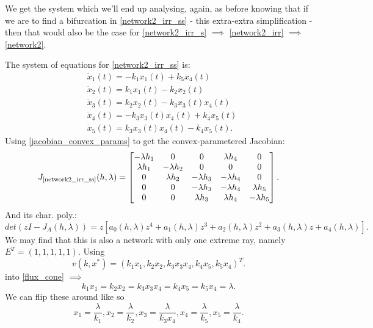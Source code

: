 We get the system which we'll end up analysing, again, as before knowing that if we are to find a bifurcation in \ref{network2_irr_ss} - this extra-extra simplification - then that would also be the case for \ref{network2_irr_s} $\implies$ \ref{network2_irr} $\implies$ \ref{network2}.

The system of equations for \ref{network2_irr_ss} is:
\begin{equation}\label{last_dyn_sys}
	\begin{aligned}&\dot{x}_1(t)=-k_1x_1(t)+k_5x_4(t)\\&\dot{x}_2(t)=k_1x_1(t)-k_2x_2(t)\\&\dot{x}_3(t)=k_2x_2(t)-k_3x_3(t)x_4(t)\\&\dot{x}_4(t)=-k_3x_3(t)x_4(t)+k_4x_5(t)\\&\dot{x}_5(t)=k_3x_3(t)x_4(t)-k_4x_5(t).
	\end{aligned}
\end{equation}
Using \ref{jacobian_convex_params} to get the convex-parametered Jacobian:
\[
	J_{\text{\ref{network2_irr_ss}}}(h,\lambda)=
	\begin{bmatrix}-\lambda h_{1}&0&0&\lambda h_{4}&0\\\lambda h_{1}&-\lambda h_{2}&0&0&0\\0&\lambda h_{2}&-\lambda h_{3}&-\lambda h_{4}&0\\0&0&-\lambda h_{3}&-\lambda h_{4}&\lambda h_{5}\\0&0&\lambda h_{3}&\lambda h_{4}&-\lambda h_{5}
	\end{bmatrix}.
\]
And its char. poly.:
\[
	det(zI-J_A(h,\lambda))=z[a_0(h,\lambda)z^4+a_1(h,\lambda)z^3+a_2(h,\lambda)z^2+a_3(h,\lambda)z+a_4(h,\lambda)].
\]
We may find that this is also a network with only one extreme ray, namely $E^T = \left(1,1,1,1,1\right)$. Using
\[
	v(k,x^*)=(k_1x_1,k_2x_2,k_3x_3x_4,k_4x_5,k_5x_4)^T.
\]
into \ref{flux_cone} $\implies$
\[
	k_1x_1=k_2x_2=k_3x_3x_4=k_4x_5=k_5x_4=\lambda.
\]
We can flip these around like so
\begin{equation}\label{last_jacobian}
	x_{1}=\frac{\lambda}{k_{1}},x_{2}=\frac{\lambda}{k_{2}},x_{3}=\frac{\lambda}{k_{3}x_{4}},x_{4}=\frac{\lambda}{k_{5}},x_{5}=\frac{\lambda}{k_{4}}.
\end{equation}

